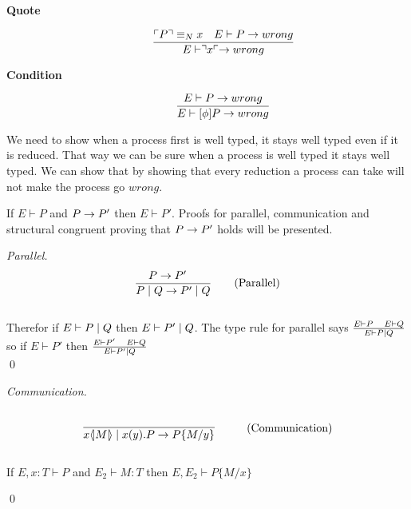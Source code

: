 \begin{description}
    \item[\textbf{Quote}]\begin{align*}
        \frac{\ulcorner P \urcorner \equiv _N x \quad E \vdash P \rightarrow wrong}{E \vdash \urcorner x \ulcorner \rightarrow wrong}
    \end{align*}

    \item[\textbf{Condition}]\begin{align*}
        \frac{E \vdash P \rightarrow wrong}{E \vdash [\phi]P \rightarrow wrong}
    \end{align*}
\end{description}



\begin{theorem}
We need to show when a process first is well typed, it stays well typed even if it is reduced. That way we can be sure when a process is well typed it stays well typed. We can show that by showing that every reduction a process can take will not make the process go \ensuremath{wrong}.

    If \ensuremath{E \vdash P} and \ensuremath{P\ra P'} then \ensuremath{E \vdash P'}.
    Proofs for parallel, communication and structural congruent proving that \ensuremath{P \ra P'} holds will be presented.\\

    \begin{proof}[Parallel]
        \begin{align*}
            \frac{P \rightarrow P' \quad}{P \mid Q \rightarrow P' \mid Q} \tag{Parallel}
        \end{align*}\\

    Therefor if \ensuremath{E \vdash P \para Q} then \ensuremath{E \vdash P' \para Q}. The type rule for parallel says \ensuremath{\frac{E \vdash P\quad E \vdash Q}{E \vdash P \para Q}} so if \ensuremath{E \vdash P'} then \ensuremath{\frac{E \vdash P' \quad E \vdash Q}{E \vdash P' \para Q}}\\
        \qed
    \end{proof}

    \begin{proof}[Communication]
        \begin{align*}
            \infrule{}{\lift{x}{M}\para\inp{x}{y}P\ra P\{M/y\}} \tag{Communication}
        \end{align*}

        \begin{lemma}[Substitution]
            If \ensuremath{E,x:T \vdash P} and \ensuremath{E_2 \vdash M:T} then \ensuremath{E, E_2 \vdash P\{M/x \}}
        \end{lemma}
        \qed
    \end{proof}


\end{theorem}
